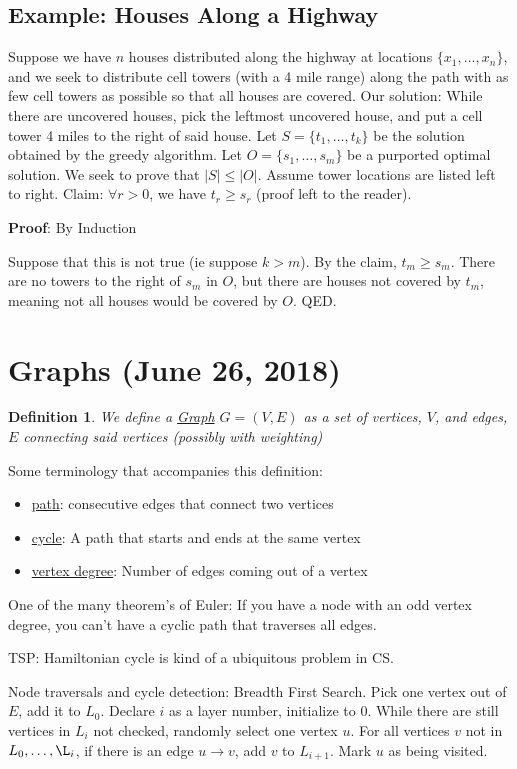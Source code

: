 \documentclass[11pt,letterpaper]{article}
\newtheorem{defn}{Definition}
\begin{document}
\subsection*{Example: Houses Along a Highway}
Suppose we have $n$ houses distributed along the highway at locations $\{x_1, \ldots, x_n\}$, and we seek to distribute cell towers (with a 4 mile range) along the path with as few cell towers as possible so that all houses are covered. Our solution: While there are uncovered houses, pick the leftmost uncovered house, and put a cell tower 4 miles to the right of said house. Let $S = \{ t_1, \ldots, t_k\}$ be the solution obtained by the greedy algorithm. Let $O = \{s_1,\ldots, s_m\}$ be a purported optimal solution. We seek to prove that $|S| \leq |O|$. Assume tower locations are listed left to right. Claim: $\forall r>0$, we have $t_r \geq s_r$ (proof left to the reader).

\textbf{Proof}: By Induction

Suppose that this is not true (ie suppose $k > m$). By the claim, $t_m \geq s_m$. There are no towers to the right of $s_m$ in $O$, but there are houses not covered by $t_m$, meaning not all houses would be covered by $O$. QED. 

\section*{Graphs (June 26, 2018)}
\begin{defn}
	We define a \underline{Graph} $G = (V, E)$ as a set of vertices, $V$, and edges, $E$ connecting said vertices (possibly with weighting)
\end{defn}
Some terminology that accompanies this definition:
\begin{itemize}
	\item \underline{path}: consecutive edges that connect two vertices
	\item \underline{cycle}: A path that starts and ends at the same vertex
	\item \underline{vertex degree}: Number of edges coming out of a vertex
\end{itemize}
One of the many theorem's of Euler: If you have a node with an odd vertex degree, you can't have a cyclic path that traverses all edges. 

TSP: Hamiltonian cycle is kind of a ubiquitous problem in CS. 

Node traversals and cycle detection: Breadth First Search. 
Pick one vertex out of $E$, add it to $L_0$. Declare $i$ as a layer number, initialize to 0. While there are still vertices in $L_i$ not checked, randomly select one vertex $u$. For all vertices $v$ not in $L_0,\ldots,\L_i$, if there is an edge $u\to v$, add $v$ to $L_{i+1}$. Mark $u$ as being visited. 
\end{document}

